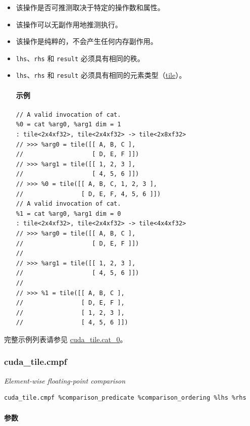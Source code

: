 \documentclass{article}
\begin{document}
\begin{itemize}
\item 该操作是否可推测取决于特定的操作数和属性。
\item 该操作可以无副作用地推测执行。
\item 该操作是纯粹的，不会产生任何内存副作用。
\item \texttt{lhs}、\texttt{rhs} 和 \texttt{result} 必须具有相同的秩。
\item \texttt{lhs}、\texttt{rhs} 和 \texttt{result} 必须具有相同的元素类型（\href{https://docs.nvidia.com/cuda/tile-ir/latest/sections/types.html#type-tile}{tile}）。


\paragraph{示例}

\begin{lstlisting}
// A valid invocation of cat.
%0 = cat %arg0, %arg1 dim = 1
: tile<2x4xf32>, tile<2x4xf32> -> tile<2x8xf32>
// >>> %arg0 = tile([[ A, B, C ],
//                   [ D, E, F ]])
// >>> %arg1 = tile([[ 1, 2, 3 ],
//                   [ 4, 5, 6 ]])
// >>> %0 = tile([[ A, B, C, 1, 2, 3 ],
//                [ D, E, F, 4, 5, 6 ]])
// A valid invocation of cat.
%1 = cat %arg0, %arg1 dim = 0
: tile<2x4xf32>, tile<2x4xf32> -> tile<4x4xf32>
// >>> %arg0 = tile([[ A, B, C ],
//                   [ D, E, F ]])
//
// >>> %arg1 = tile([[ 1, 2, 3 ],
//                   [ 4, 5, 6 ]])
//
// >>> %1 = tile([[ A, B, C ],
//                [ D, E, F ],
//                [ 1, 2, 3 ],
//                [ 4, 5, 6 ]])
\end{lstlisting}

\end{itemize}
完整示例列表请参见 \href{https://docs.nvidia.com/cuda/tile-ir/latest/sections/appendix.html#example-cuda-tile-cat-0}{cuda\_tile.cat\_0}。



\subsubsection{cuda\_tile.cmpf}

\textit{Element-wise floating-point comparison}


\begin{lstlisting}
cuda_tile.cmpf %comparison_predicate %comparison_ordering %lhs %rhs
\end{lstlisting}

\paragraph{参数}
\end{document}
